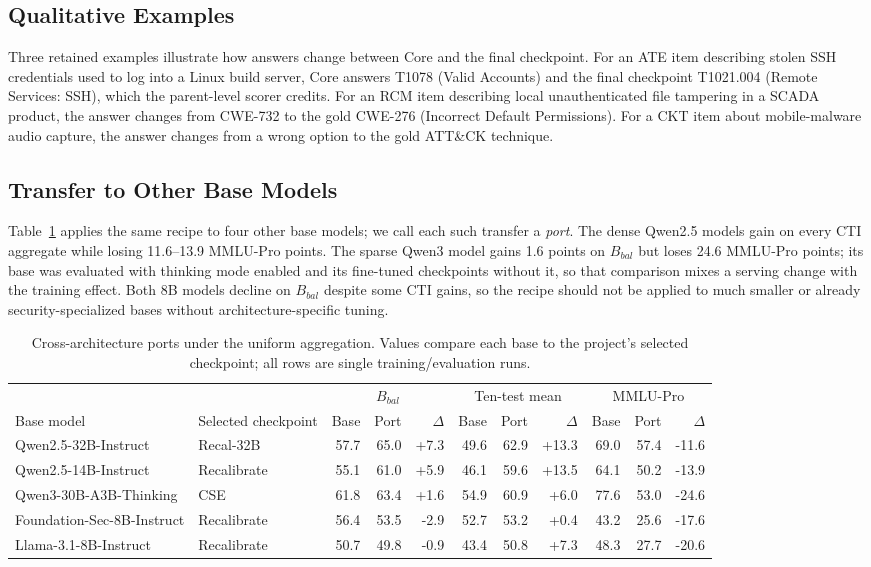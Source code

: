 \documentclass[conference]{IEEEtran}
\begin{document}
\subsection{Qualitative Examples}
Three retained examples illustrate how answers change between Core and the final checkpoint. For an ATE item describing stolen SSH credentials used to log into a Linux build server, Core answers T1078 (Valid Accounts) and the final checkpoint T1021.004 (Remote Services: SSH), which the parent-level scorer credits. For an RCM item describing local unauthenticated file tampering in a SCADA product, the answer changes from CWE-732 to the gold CWE-276 (Incorrect Default Permissions). For a CKT item about mobile-malware audio capture, the answer changes from a wrong option to the gold ATT\&CK technique.

\subsection{Transfer to Other Base Models}\label{sec:ports}
Table~\ref{tab:ports} applies the same recipe to four other base models; we call each such transfer a \emph{port}. The dense Qwen2.5 models gain on every CTI aggregate while losing 11.6--13.9 MMLU-Pro points. The sparse Qwen3 model gains 1.6 points on $B_{bal}$ but loses 24.6 MMLU-Pro points; its base was evaluated with thinking mode enabled and its fine-tuned checkpoints without it, so that comparison mixes a serving change with the training effect. Both 8B models decline on $B_{bal}$ despite some CTI gains, so the recipe should not be applied to much smaller or already security-specialized bases without architecture-specific tuning.

\begin{table}[t]
\caption{Cross-architecture ports under the uniform aggregation. Values compare each base to the project's selected checkpoint; all rows are single training/evaluation runs.}
\label{tab:ports}
\centering
\scriptsize
\setlength{\tabcolsep}{3.3pt}
\begin{tabular}{@{}llrrrrrrrrr@{}}
\toprule
& & \multicolumn{3}{c}{$B_{bal}$} & \multicolumn{3}{c}{Ten-test mean} & \multicolumn{3}{c}{MMLU-Pro} \\
Base model & Selected checkpoint & Base & Port & $\Delta$ & Base & Port & $\Delta$ & Base & Port & $\Delta$ \\
\midrule
Qwen2.5-32B-Instruct & Recal-32B & 57.7 & 65.0 & +7.3 & 49.6 & 62.9 & +13.3 & 69.0 & 57.4 & -11.6 \\
Qwen2.5-14B-Instruct & Recalibrate & 55.1 & 61.0 & +5.9 & 46.1 & 59.6 & +13.5 & 64.1 & 50.2 & -13.9 \\
Qwen3-30B-A3B-Thinking & CSE & 61.8 & 63.4 & +1.6 & 54.9 & 60.9 & +6.0 & 77.6 & 53.0 & -24.6 \\
Foundation-Sec-8B-Instruct & Recalibrate & 56.4 & 53.5 & -2.9 & 52.7 & 53.2 & +0.4 & 43.2 & 25.6 & -17.6 \\
Llama-3.1-8B-Instruct & Recalibrate & 50.7 & 49.8 & -0.9 & 43.4 & 50.8 & +7.3 & 48.3 & 27.7 & -20.6 \\
\bottomrule
\end{tabular}
\end{table}
\end{document}
